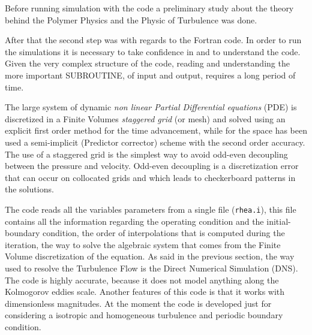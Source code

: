 Before running simulation with the code a preliminary study about the theory behind the Polymer Physics and the Physic of Turbulence was done. 

After that the second step was with regards to the Fortran code. In order to run the simulations it is necessary to take confidence in and to understand the code.
Given the very complex structure of the code, reading and understanding the more important \textsc{SUBROUTINE}, of input and output, requires a long period of time.

The large system of dynamic \textit{non linear Partial Differential equations}  (PDE) is discretized in a Finite Volumes \textit{staggered grid} (or mesh) and solved using an explicit first order method for the time advancement, while for the space has been used a semi-implicit (Predictor corrector) scheme with the second order accuracy.  
The use of a staggered grid is the simplest way to avoid odd-even decoupling between the pressure and velocity. Odd-even decoupling is a discretization error that can occur on collocated grids and which leads to checkerboard patterns in the solutions.


The code reads all the variables parameters from a single file (\verb|rhea.i|), this file contains all the information regarding the operating condition and the initial-boundary condition, the order of interpolations that
is computed during the iteration, the way to solve the algebraic system that comes from the Finite Volume discretization of the equation. 
As said in the previous section, the way used to resolve the Turbulence Flow is the Direct Numerical Simulation (DNS). The code is highly accurate, because it does not model anything along the Kolmogorov eddies scale. 
Another features of this code is that it works with dimensionless magnitudes.
At the moment the code is developed just for considering a isotropic and homogeneous turbulence and periodic boundary condition.  





